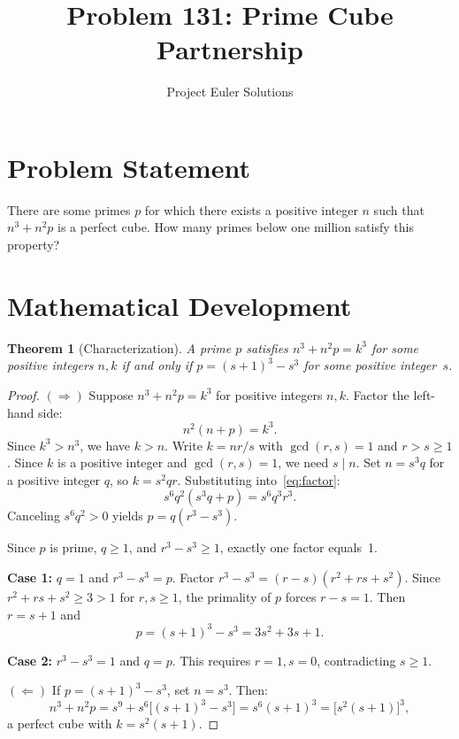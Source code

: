 \documentclass[12pt]{article}
\title{Problem 131: Prime Cube Partnership}
\author{Project Euler Solutions}
\date{}
\newtheorem{theorem}{Theorem}
\begin{document}
\maketitle

\section{Problem Statement}
There are some primes $p$ for which there exists a positive integer $n$ such that $n^3 + n^2 p$ is a perfect cube. How many primes below one million satisfy this property?

\section{Mathematical Development}

\begin{theorem}[Characterization]
A prime $p$ satisfies $n^3 + n^2 p = k^3$ for some positive integers $n, k$ if and only if $p = (s+1)^3 - s^3$ for some positive integer~$s$.
\end{theorem}

\begin{proof}
$(\Rightarrow)$ Suppose $n^3 + n^2 p = k^3$ for positive integers $n, k$. Factor the left-hand side:
\begin{equation}\label{eq:factor}
n^2(n + p) = k^3.
\end{equation}
Since $k^3 > n^3$, we have $k > n$. Write $k = nr/s$ with $\gcd(r, s) = 1$ and $r > s \geq 1$. Since $k$ is a positive integer and $\gcd(r,s) = 1$, we need $s \mid n$. Set $n = s^3 q$ for a positive integer $q$, so $k = s^2 q r$. Substituting into~\eqref{eq:factor}:
\[
s^6 q^2(s^3 q + p) = s^6 q^3 r^3.
\]
Canceling $s^6 q^2 > 0$ yields $p = q(r^3 - s^3)$.

Since $p$ is prime, $q \geq 1$, and $r^3 - s^3 \geq 1$, exactly one factor equals~1.

\textbf{Case 1:} $q = 1$ and $r^3 - s^3 = p$. Factor $r^3 - s^3 = (r - s)(r^2 + rs + s^2)$. Since $r^2 + rs + s^2 \geq 3 > 1$ for $r, s \geq 1$, the primality of $p$ forces $r - s = 1$. Then $r = s + 1$ and
\[
p = (s+1)^3 - s^3 = 3s^2 + 3s + 1.
\]

\textbf{Case 2:} $r^3 - s^3 = 1$ and $q = p$. This requires $r = 1, s = 0$, contradicting $s \geq 1$.

$(\Leftarrow)$ If $p = (s+1)^3 - s^3$, set $n = s^3$. Then:
\[
n^3 + n^2 p = s^9 + s^6\bigl[(s+1)^3 - s^3\bigr] = s^6(s+1)^3 = \bigl[s^2(s+1)\bigr]^3,
\]
a perfect cube with $k = s^2(s+1)$.
\end{proof}
\end{document}
